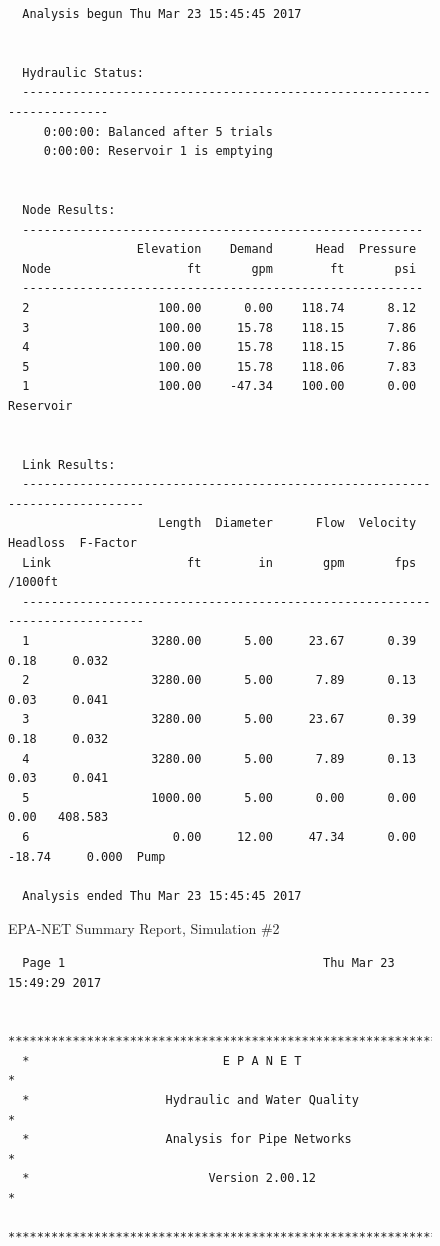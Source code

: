 \documentclass[11pt]{article}
\begin{document}
\begin{enumerate}
\begin{figure}[ht!]
\begin{verbatim}
  Analysis begun Thu Mar 23 15:45:45 2017

   
  Hydraulic Status:
  -----------------------------------------------------------------------
     0:00:00: Balanced after 5 trials
     0:00:00: Reservoir 1 is emptying
   
   
  Node Results:
  --------------------------------------------------------
                  Elevation    Demand      Head  Pressure
  Node                   ft       gpm        ft       psi
  --------------------------------------------------------
  2                  100.00      0.00    118.74      8.12
  3                  100.00     15.78    118.15      7.86
  4                  100.00     15.78    118.15      7.86
  5                  100.00     15.78    118.06      7.83
  1                  100.00    -47.34    100.00      0.00  Reservoir
   
   
  Link Results:
  ----------------------------------------------------------------------------
                     Length  Diameter      Flow  Velocity  Headloss  F-Factor
  Link                   ft        in       gpm       fps   /1000ft          
  ----------------------------------------------------------------------------
  1                 3280.00      5.00     23.67      0.39      0.18     0.032
  2                 3280.00      5.00      7.89      0.13      0.03     0.041
  3                 3280.00      5.00     23.67      0.39      0.18     0.032
  4                 3280.00      5.00      7.89      0.13      0.03     0.041
  5                 1000.00      5.00      0.00      0.00      0.00   408.583
  6                    0.00     12.00     47.34      0.00    -18.74     0.000  Pump
   
  Analysis ended Thu Mar 23 15:45:45 2017  \end{verbatim}
     \caption{EPA-NET Summary Report, Simulation \#2}
   \label{fig:epanet2} 
\end{figure}
\begin{figure}[ht!] %
\centering
\begin{verbatim}
  Page 1                                    Thu Mar 23 15:49:29 2017

  ******************************************************************
  *                           E P A N E T                          *
  *                   Hydraulic and Water Quality                  *
  *                   Analysis for Pipe Networks                   *
  *                         Version 2.00.12                        *
  ******************************************************************
  

\end{verbatim}
\end{figure}
\end{enumerate}
\end{document}
